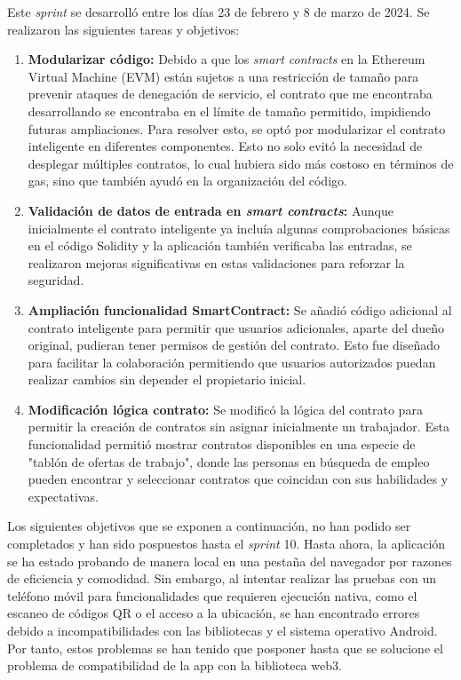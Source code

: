 Este \textit{sprint} se desarrolló entre los días 23 de febrero y 8 de marzo de 2024. Se realizaron las siguientes tareas y objetivos:

\begin{enumerate}

\item \textbf{Modularizar código:} Debido a que los \textit{smart contracts} en la Ethereum Virtual Machine (EVM) están sujetos a una restricción de tamaño para prevenir ataques de denegación de servicio, el contrato que me encontraba desarrollando se encontraba en el límite de tamaño permitido, impidiendo futuras ampliaciones. 
Para resolver esto, se optó por modularizar el contrato inteligente en diferentes componentes. Esto no solo evitó la necesidad de desplegar múltiples contratos, lo cual hubiera sido más costoso en términos de gas, sino que también ayudó en la organización del código.

\item \textbf{Validación de datos de entrada en \textit{smart contracts}:} Aunque inicialmente el contrato inteligente ya incluía algunas comprobaciones básicas en el código Solidity y la aplicación también verificaba las entradas, se realizaron mejoras significativas en estas validaciones para reforzar la seguridad.

\item \textbf{Ampliación funcionalidad SmartContract:} Se añadió código adicional al contrato inteligente para permitir que usuarios adicionales, aparte del dueño original, pudieran tener permisos de gestión del contrato. Esto fue diseñado para facilitar la colaboración permitiendo que usuarios autorizados puedan realizar cambios sin depender el propietario inicial.

\item \textbf{Modificación lógica contrato:} Se modificó la lógica del contrato para permitir la creación de contratos sin asignar inicialmente un trabajador. Esta funcionalidad permitió mostrar contratos disponibles en una especie de "tablón de ofertas de trabajo", donde las personas en búsqueda de empleo pueden encontrar y seleccionar contratos que coincidan con sus habilidades y expectativas.

\end{enumerate}

Los siguientes objetivos que se exponen a continuación, no han podido ser completados y han sido pospuestos hasta el \textit{sprint} 10.
Hasta ahora, la aplicación se ha estado probando de manera local en una pestaña del navegador por razones de eficiencia y comodidad. Sin embargo, al intentar realizar las pruebas con un teléfono móvil para funcionalidades que requieren ejecución nativa, como el escaneo de códigos QR o el acceso a la ubicación, se han encontrado errores debido a incompatibilidades con las bibliotecas y el sistema operativo Android.  
Por tanto, estos problemas se han tenido que posponer hasta que se solucione el problema de compatibilidad de la app con la biblioteca web3.


